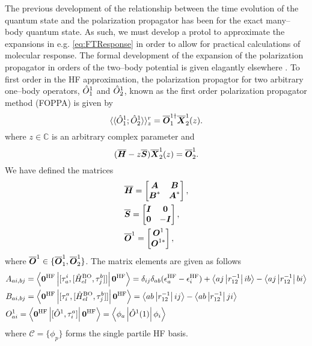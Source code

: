 The previous development of the relationship between the time evolution of the quantum state and the polarization
propagator has been for the exact many--body quantum state. As such, we must develop a protol to approximate
the expansions in e.g. \cref{eq:FTResponse} in order to allow for practical calculations of molecular response. 
The formal development of the expansion of the polarization propagator in orders of the two--body potential
is given elagantly elsewhere . To first order in the HF approximation, the polarization propagtor for two arbitrary 
one--body operators, $\hat{O}^1_1$ and $\hat{O}^1_2$, known as the first order polarization propagator method (FOPPA) is given by
\begin{equation}
  \label{eq:FOPPA}
  \langle \langle \hat{O}^1_1; \hat{O}^1_2 \rangle \rangle^r_z = \boldsymbol{\overline {O}}^{1\dagger}_1 \boldsymbol{\overline {X}}^1_2(z).
\end{equation}
where $z \in \mathbb C$ is an arbitrary complex parameter and
\begin{equation}
  (\boldsymbol{\overline H} - z \boldsymbol{\overline S}) \boldsymbol{\overline X}^1_2(z) = \boldsymbol{\overline O}^1_2.
\end{equation}
We have defined the matrices
\begin{align}
  &\boldsymbol{\overline H} = \begin{bmatrix} \boldsymbol{A} & \boldsymbol{B} \\ \boldsymbol{B}^* & \boldsymbol{A}^* \end{bmatrix}, \\
  &\boldsymbol{\overline S} = \begin{bmatrix} \boldsymbol{I} & \boldsymbol{0} \\ \boldsymbol{0} & -\boldsymbol{I} \end{bmatrix}, \\
  &\boldsymbol{\overline O}^1 = \begin{bmatrix} \boldsymbol{O}^1 \\ \boldsymbol{O}^{1*} \end{bmatrix},
\end{align}
where $\boldsymbol{\overline O}^1 \in \{ \boldsymbol{\overline O}^1_1, \boldsymbol{\overline O}^1_2 \}$. The matrix
elements are given as follows
\begin{align}
  &A_{ai,bj} = \left\langle \boldsymbol{0}^{\mathrm{HF}} \left\vert [\tau^i_a,[\hat{H}^{\mathrm{BO}}_{el}, \tau_j^b]] \right\vert \boldsymbol{0}^{\mathrm{HF}} \right\rangle = 
    \delta_{ij}\delta_{ab}(\epsilon^{\mathrm{HF}}_a - \epsilon^{\mathrm{HF}}_i) + \left\langle aj \left\vert r_{12}^{-1} \right\vert ib \right\rangle - \left\langle aj \left\vert r_{12}^{-1} \right\vert bi \right\rangle \\
  &B_{ai,bj} = \left\langle \boldsymbol{0}^{\mathrm{HF}} \left\vert [\tau^a_i,[\hat{H}^{\mathrm{BO}}_{el}, \tau_j^b]] \right\vert \boldsymbol{0}^{\mathrm{HF}} \right\rangle = 
    \left\langle ab \left\vert r_{12}^{-1} \right\vert ij \right\rangle - \left\langle ab \left\vert r_{12}^{-1} \right\vert ji \right\rangle \\
  &O^1_{ai} = \left\langle \boldsymbol{0}^{\mathrm{HF}} \left\vert [\hat{O}^1,\tau^{a}_i] \right\vert \boldsymbol{0}^{\mathrm{HF}} \right\rangle = \left\langle \phi_a \left\vert \hat{O}^1(1) \right\vert \phi_i \right\rangle
\end{align}
where $\mathcal C = \{ \phi_p \}$ forms the single partile HF basis.

